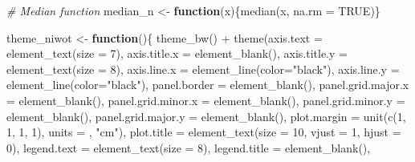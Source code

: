 \documentclass[a4paper,nobind]{templates/ociamthesis}
\newenvironment{Shaded}{\begin{snugshade}}{\end{snugshade}}
\newcommand{\AttributeTok}[1]{\textcolor[rgb]{0.77,0.63,0.00}{#1}}
\newcommand{\CommentTok}[1]{\textcolor[rgb]{0.56,0.35,0.01}{\textit{#1}}}
\newcommand{\ConstantTok}[1]{\textcolor[rgb]{0.00,0.00,0.00}{#1}}
\newcommand{\ControlFlowTok}[1]{\textcolor[rgb]{0.13,0.29,0.53}{\textbf{#1}}}
\newcommand{\DecValTok}[1]{\textcolor[rgb]{0.00,0.00,0.81}{#1}}
\newcommand{\FunctionTok}[1]{\textcolor[rgb]{0.00,0.00,0.00}{#1}}
\newcommand{\NormalTok}[1]{#1}
\newcommand{\OtherTok}[1]{\textcolor[rgb]{0.56,0.35,0.01}{#1}}
\newcommand{\SpecialCharTok}[1]{\textcolor[rgb]{0.00,0.00,0.00}{#1}}
\newcommand{\StringTok}[1]{\textcolor[rgb]{0.31,0.60,0.02}{#1}}
\renewenvironment{Shaded}
{
  \vspace{10pt}%
  \begin{snugshade}%
}{%
  \end{snugshade}%
  \vspace{8pt}%
}
\begin{document}
\begin{Shaded}
\begin{Highlighting}[]
\CommentTok{\# Median function}
\NormalTok{median\_n }\OtherTok{\textless{}{-}} \ControlFlowTok{function}\NormalTok{(x)\{}\FunctionTok{median}\NormalTok{(x, }\AttributeTok{na.rm =} \ConstantTok{TRUE}\NormalTok{)\}}
\end{Highlighting}
\end{Shaded}

\begin{Shaded}
\begin{Highlighting}[]
\NormalTok{theme\_niwot }\OtherTok{\textless{}{-}} \ControlFlowTok{function}\NormalTok{()\{}
  \FunctionTok{theme\_bw}\NormalTok{() }\SpecialCharTok{+}
    \FunctionTok{theme}\NormalTok{(}\AttributeTok{axis.text =} \FunctionTok{element\_text}\NormalTok{(}\AttributeTok{size =} \DecValTok{7}\NormalTok{), }
          \AttributeTok{axis.title.x =} \FunctionTok{element\_blank}\NormalTok{(),}
          \AttributeTok{axis.title.y =} \FunctionTok{element\_text}\NormalTok{(}\AttributeTok{size =} \DecValTok{8}\NormalTok{),}
          \AttributeTok{axis.line.x =} \FunctionTok{element\_line}\NormalTok{(}\AttributeTok{color=}\StringTok{"black"}\NormalTok{), }
          \AttributeTok{axis.line.y =} \FunctionTok{element\_line}\NormalTok{(}\AttributeTok{color=}\StringTok{"black"}\NormalTok{),}
          \AttributeTok{panel.border =} \FunctionTok{element\_blank}\NormalTok{(),}
          \AttributeTok{panel.grid.major.x =} \FunctionTok{element\_blank}\NormalTok{(),                                          }
          \AttributeTok{panel.grid.minor.x =} \FunctionTok{element\_blank}\NormalTok{(),}
          \AttributeTok{panel.grid.minor.y =} \FunctionTok{element\_blank}\NormalTok{(),}
          \AttributeTok{panel.grid.major.y =} \FunctionTok{element\_blank}\NormalTok{(),  }
          \AttributeTok{plot.margin =} \FunctionTok{unit}\NormalTok{(}\FunctionTok{c}\NormalTok{(}\DecValTok{1}\NormalTok{, }\DecValTok{1}\NormalTok{, }\DecValTok{1}\NormalTok{, }\DecValTok{1}\NormalTok{), }\AttributeTok{units =}\NormalTok{ , }\StringTok{"cm"}\NormalTok{),}
          \AttributeTok{plot.title =} \FunctionTok{element\_text}\NormalTok{(}\AttributeTok{size =} \DecValTok{10}\NormalTok{, }\AttributeTok{vjust =} \DecValTok{1}\NormalTok{, }\AttributeTok{hjust =} \DecValTok{0}\NormalTok{),}
          \AttributeTok{legend.text =} \FunctionTok{element\_text}\NormalTok{(}\AttributeTok{size =} \DecValTok{8}\NormalTok{),          }
          \AttributeTok{legend.title =} \FunctionTok{element\_blank}\NormalTok{(),                              }

\end{Highlighting}
\end{Shaded}
\end{document}

